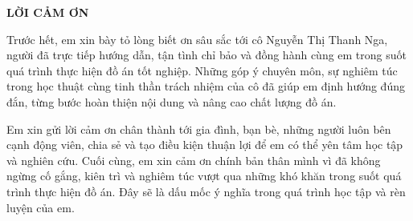 \documentclass[../DoAn.tex]{subfiles}
\begin{document}
\begin{center}
    \Large{\textbf{LỜI CẢM ƠN}}\\
\end{center}
\vspace{1cm}

Trước hết, em xin bày tỏ lòng biết ơn sâu sắc tới cô Nguyễn Thị Thanh Nga, người đã trực tiếp hướng dẫn, tận tình chỉ bảo và đồng hành cùng em trong suốt quá trình thực hiện đồ án tốt nghiệp. Những góp ý chuyên môn, sự nghiêm túc trong học thuật cùng tinh thần trách nhiệm của cô đã giúp em định hướng đúng đắn, từng bước hoàn thiện nội dung và nâng cao chất lượng đồ án.

Em xin gửi lời cảm ơn chân thành tới gia đình, bạn bè, những người luôn bên cạnh động viên, chia sẻ và tạo điều kiện thuận lợi để em có thể yên tâm học tập và nghiên cứu. Cuối cùng, em xin cảm ơn chính bản thân mình vì đã không ngừng cố gắng, kiên trì và nghiêm túc vượt qua những khó khăn trong suốt quá trình thực hiện đồ án. Đây sẽ là dấu mốc ý nghĩa trong quá trình học tập và rèn luyện của em.
\end{document}
